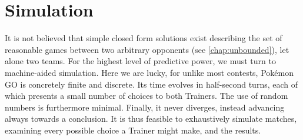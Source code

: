 \chapter{Simulation}
\label{chap:simul}

It is not believed that simple closed form solutions exist describing
 the set of reasonable games between two arbitrary opponents (see \autoref{chap:unbounded}),
 let alone two teams.
For the highest level of predictive power, we must turn to machine-aided simulation.
Here we are lucky, for unlike most contests, Pokémon GO is concretely finite and discrete.
Its time evolves in half-second turns, each of which presents a small number of choices
  to both Trainers.
The use of random numbers is furthermore minimal.
Finally, it never diverges, instead advancing always towards a conclusion.
It is thus feasible to exhaustively simulate matches, examining every possible choice
  a Trainer might make, and the results.
